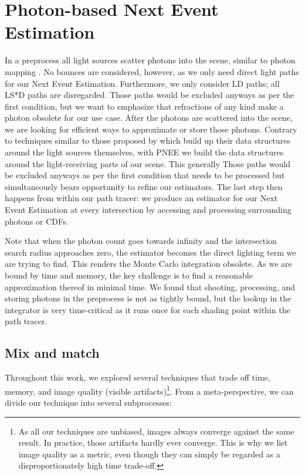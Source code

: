 
\chapter{Photon-based Next Event Estimation}
\label{ch:PNEE}


In a preprocess all light sources scatter photons into the scene, similar to photon mapping \parencite{jensen2001realistic}. No bounces are considered, however, as we only need direct light paths for our Next Event Estimation. Furthermore, we only consider LD paths; all LS*D paths are disregarded. Those paths would be excluded anyways as per the first condition, but we want to emphasize that refractions of any kind make a photon obsolete for our use case. After the photons are scattered into the scene, we are looking for efficient ways to approximate or store those photons. Contrary to techniques similar to those proposed by \textcite{Estevez} which build up their data structures around the light sources themselves, with PNEE we build the data structures around the light-receiving parts of our scene. This generally Those paths would be excluded anyways as per the first condition that needs to be processed but simultaneously bears opportunity to refine our estimators. The last step then happens from within our path tracer: we produce an estimator for our Next Event Estimation at every intersection by accessing and processing surrounding photons or CDFs.

Note that when the photon count goes towards infinity and the intersection search radius approaches zero, the estimator becomes the direct lighting term we are trying to find. This renders the Monte Carlo integration obsolete. As we are bound by time and memory, the key challenge is to find a reasonable approximation thereof in minimal time. We found that shooting, processing, and storing photons in the preprocess is not as tightly bound, but the lookup in the integrator is very time-critical as it runs once for each shading point within the path tracer.



\section{Mix and match}
\label{sec:mixandmatch}
Throughout this work, we explored several techniques that trade off time, memory, and image quality (visible artifacts)\footnote{As all our techniques are unbiased, images always converge against the same result. In practice, those artifacts hardly ever converge. This is why we list image quality as a metric, even though they can simply be regarded as a disproportionately high time trade-off.}. From a meta-perspective, we can divide our technique into several subprocesses:

